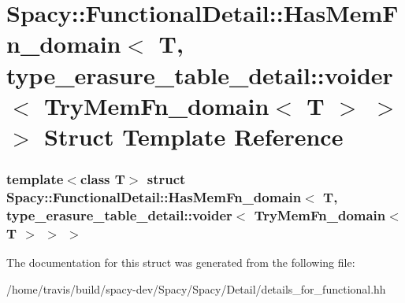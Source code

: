 \hypertarget{structSpacy_1_1FunctionalDetail_1_1HasMemFn__domain_3_01T_00_01type__erasure__table__detail_1_1vacd076bf14825d382baea4becee4ce20}{\section{\-Spacy\-:\-:\-Functional\-Detail\-:\-:\-Has\-Mem\-Fn\-\_\-domain$<$ \-T, type\-\_\-erasure\-\_\-table\-\_\-detail\-:\-:voider$<$ \-Try\-Mem\-Fn\-\_\-domain$<$ \-T $>$ $>$ $>$ \-Struct \-Template \-Reference}
\label{structSpacy_1_1FunctionalDetail_1_1HasMemFn__domain_3_01T_00_01type__erasure__table__detail_1_1vacd076bf14825d382baea4becee4ce20}
}
\subsubsection*{template$<$class T$>$ struct Spacy\-::\-Functional\-Detail\-::\-Has\-Mem\-Fn\-\_\-domain$<$ T, type\-\_\-erasure\-\_\-table\-\_\-detail\-::voider$<$ Try\-Mem\-Fn\-\_\-domain$<$ T $>$ $>$ $>$}



\-The documentation for this struct was generated from the following file\-:\begin{DoxyCompactItemize}
\item 
/home/travis/build/spacy-\/dev/\-Spacy/\-Spacy/\-Detail/details\-\_\-for\-\_\-functional.\-hh\end{DoxyCompactItemize}
